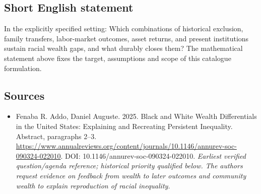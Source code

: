 \documentclass[11pt]{article}
\begin{document}
\subsection{Short English statement}
In the explicitly specified setting: Which combinations of historical exclusion, family transfers, labor-market outcomes, asset returns, and present institutions sustain racial wealth gaps, and what durably closes them? The mathematical statement above fixes the target, assumptions and scope of this catalogue formulation.

\subsection{Sources}
\begin{itemize}\raggedright
\item[\textnormal{[S1]}]\hypertarget{source:30007647:1}{} Fenaba R. Addo, Daniel Auguste. 2025. Black and White Wealth Differentials in the United States: Explaining and Recreating Persistent Inequality. Abstract, paragraphs 2–3.
\url{https://www.annualreviews.org/content/journals/10.1146/annurev-soc-090324-022010}.
DOI: 10.1146/annurev-soc-090324-022010.
{\small\textit{Earliest verified question/agenda reference; historical priority qualified below. The authors request evidence on feedback from wealth to later outcomes and community wealth to explain reproduction of racial inequality.}}
\end{itemize}
\end{document}
